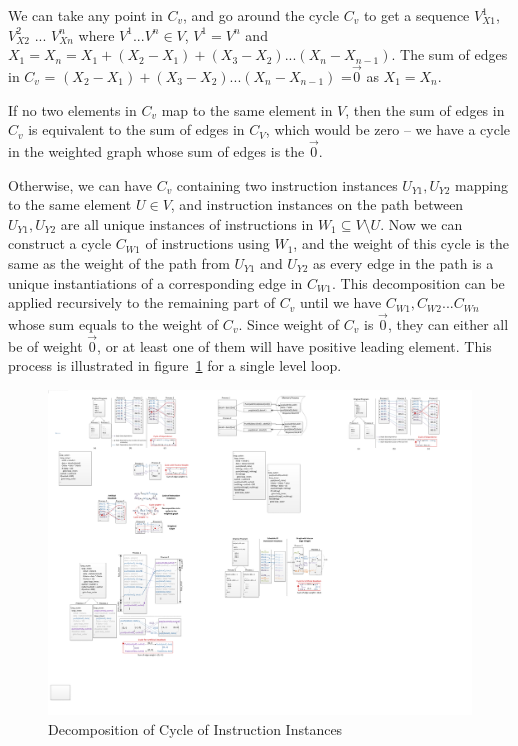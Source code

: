 We can take any point in  $C_v$, and go around the
cycle $C_v$ to get a sequence $V^1_{X1}$, $V^2_{X2}$ ... $V^n_{Xn}$ where $V^1 ... V^n \in V$, $V^1 = V^n$ and $X_1 = X_n = X_1 + (X_2-X_1) + (X_3-X_2) ... (X_n - X_{n-1})$. The sum of edges in $C_v$ = $(X_2-X_1) + (X_3-X_2) ... (X_n - X_{n-1})$ =$\vec{0}$ as $X_1 = X_n$.  

If no two elements in $C_v$ map to the same
element in $V$, then the sum of edges in $C_v$ is equivalent to the 
sum of edges in $C_V$, which would be zero -- we have a cycle in the weighted
graph whose sum of edges is the $\vec{0}$.

Otherwise, we can have $C_v$ containing two instruction instances $U_{Y1}, U_{Y2}$ mapping to the same element $U \in V$, and instruction instances on the path between $U_{Y1}, U_{Y2}$ are all unique instances of instructions in  $W_1 \subseteq  V \setminus U$.  
Now we can construct a cycle $C_{W1}$ of instructions using $W_1$, and the weight of this cycle is the same as the weight of the path from $U_{Y1}$ and 
$U_{Y2}$ as every edge in the path is a unique instantiations of a corresponding edge in $C_{W1}$. This decomposition can be applied recursively to 
the remaining part of $C_v$ until we have $C_{W1}, C_{W2}...C_{Wn}$ whose
sum equals to the weight of $C_v$. Since weight of $C_v$ is  $\vec{0}$, 
they can either all be of weight $\vec{0}$, or at least one of them will have
positive leading element. This process is illustrated in figure~\ref{fig:decomp} for a single level loop.

\begin{figure}[htp]
\begin{center}
\includegraphics[width=0.9\linewidth]{chap4fig/decomp.pdf}
\caption{Decomposition of Cycle of Instruction Instances 
\label{fig:decomp}}
\end{center}
\end{figure}



